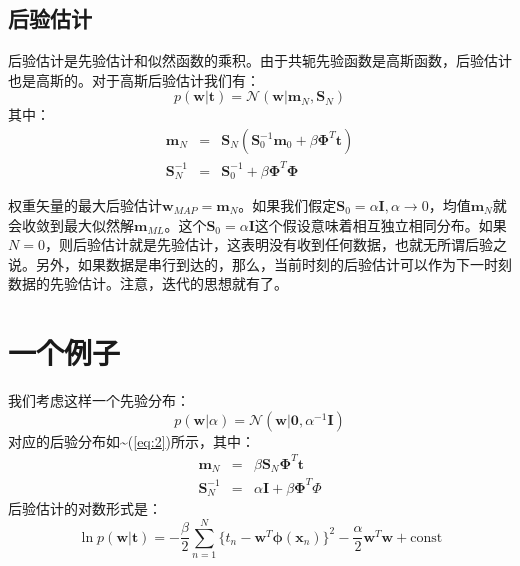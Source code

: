 \documentclass[10pt,a4paper,UTF8]{article}
\begin{document}
\subsection{后验估计}
\label{sec:orgb63002b}


后验估计是先验估计和似然函数的乘积。由于共轭先验函数是高斯函数，后验估计也是高斯的。对于高斯后验估计我们有：
\begin{equation}
\label{eq:2}
p(\mathbf{w}|\mathbf{t}) = \mathcal{N}(\mathbf{w}|\mathbf{m}_{N},\mathbf{S}_{N})
\end{equation}
其中：
\begin{eqnarray}
\label{eq:4}
\mathbf{m}_{N}&=& \mathbf{S}_{N}(\mathbf{S}_{0}^{-1}\mathbf{m}_{0} + \beta \mathbf{\Phi}^{T} \mathbf{t}) \\
\mathbf{S}_{N}^{-1} &=& \mathbf{S}_{0}^{-1} + \beta \mathbf{\Phi}^{T}\mathbf{\Phi}
\end{eqnarray}

权重矢量的最大后验估计\(\mathbf{w}_{MAP}=\mathbf{m}_{N}\)。如果我们假定\(\mathbf{S}_{0} = \alpha \mathbf{I}, \alpha\to 0\)，均值\(\mathbf{m}_{N}\)就会收敛到最大似然解\(\mathbf{m}_{ML}\)。这个\(\mathbf{S}_{0} = \alpha \mathbf{I}\)这个假设意味着相互独立相同分布。如果\(N = 0\)，则后验估计就是先验估计，这表明没有收到任何数据，也就无所谓后验之说。另外，如果数据是串行到达的，那么，当前时刻的后验估计可以作为下一时刻数据的先验估计。注意，迭代的思想就有了。
\section{一个例子}
\label{sec:org590f4f4}


我们考虑这样一个先验分布：
\begin{equation}
\label{eq:5}
p(\mathbf{w}|\alpha) = \mathcal{N}(\mathbf{w}|\mathbf{0},\alpha^{-1}\mathbf{I})
\end{equation}
对应的后验分布如\textasciitilde{}(\ref{eq:2})所示，其中：
\begin{eqnarray}
\label{eq:7}
\mathbf{m}_{N}&=&\beta \mathbf{S}_{N}\mathbf{\Phi}^{T}\mathbf{t} \\
\mathbf{S}_{N}^{-1}&=& \alpha \mathbf{I} + \beta \mathbf{\Phi}^{T}\Phi
\end{eqnarray}
后验估计的对数形式是：
\begin{equation}
\label{eq:8}
\ln p(\mathbf{w}|\mathbf{t}) = -\frac{\beta}{2} \sum_{n=1}^{N} \{t_{n} - \mathbf{w}^{T}\mathbf{\phi}(\mathbf{x}_{n}) \}^{2} - \frac{\alpha}{2}\mathbf{w}^{T}\mathbf{w} + \mathrm{const}
\end{equation}
\end{document}
